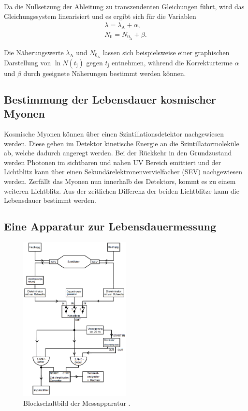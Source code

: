 Da die Nullsetzung der Ableitung zu transzendenten Gleichungen führt, wird das Gleichungssystem linearisiert und es ergibt sich für die Variablen
\begin{eqnarray*}
	\lambda = \lambda_\text{A} + \alpha ,\\
	N_\text{0} = N_{\text{0}_\text{A}} + \beta.
\end{eqnarray*}

Die Näherungswerte $\lambda_\text{A}$ und $N_{\text{0}_\text{A}}$ lassen sich beispielsweise einer graphischen Darstellung von $\ln{N(t_\text{j})}$ gegen $t_\text{j}$ entnehmen, während die Korrekturterme $\alpha$ und $\beta$ durch geeignete Näherungen bestimmt werden können.
\FloatBarrier
\subsection{Bestimmung der Lebensdauer kosmischer Myonen} %
\label{sub:bestimmung_der_lebensdauer_kosmischer_myonen}

Kosmische Myonen können über einen Szintillationsdetektor nachgewiesen werden.
Diese geben im Detektor kinetische Energie an die Szintillatormoleküle ab, welche dadurch angeregt werden.
Bei der Rückkehr in den Grundzustand werden Photonen im sichtbaren und nahen UV Bereich emittiert und der Lichtblitz kann über einen Sekundärelektronenvervielfacher (SEV) nachgewiesen werden.
Zerfällt das Myonen nun innerhalb des Detektors, kommt es zu einem weiteren Lichtblitz.
Aus der zeitlichen Differenz der beiden Lichtblitze kann die Lebensdauer bestimmt werden.
\FloatBarrier
\subsection{Eine Apparatur zur Lebensdauermessung} %
\label{sub:eine_apparatur_zur_lebensdauermessung}

\begin{figure}
	\centering
	\includegraphics[width = 0.5\textwidth]{pic/schaltung.png}
	\caption{Blockschaltbild der Messapparatur \cite{anleitung}.}
	\label{schaltung}
\end{figure}

